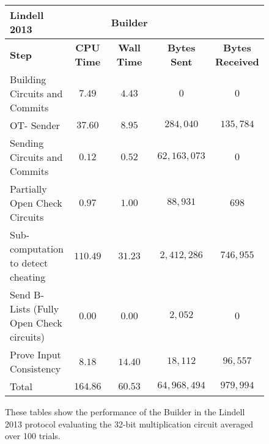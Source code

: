 \documentclass[ %
                    author={Nicholas Tutte},
                supervisor={Prof. Nigel Smart},
                    degree={MEng},
                     title={Secure Two Party Computation},
                  subtitle={A practical comparison of recent protocols},
                      type={Research - GG1K},
                      year={2015} ]{dissertation}
\begin{document}
				\begin{figure}
					\begin{tabular}{| p{3.5cm} | c c c c |}
						\hline
						\textbf{Lindell 2013} & & \textbf{Builder} & & \\
						\hline
						\textbf{Step} & \textbf{CPU Time} & \textbf{Wall Time} & \textbf{Bytes Sent} & \textbf{Bytes Received} \\
						\thickhline
						Building Circuits and Commits & $7.49$ & $4.43$ & $0$ & $0$ \\
						\hline
						OT- Sender & $37.60$ & $8.95$ & $284,040$ & $135,784$ \\
						\hline
						Sending Circuits and Commits & $0.12$ & $0.52$ & $62,163,073$ & $0$ \\
						\hline
						Partially Open Check Circuits & $0.97$ & $1.00$ & $88,931$ & $698$ \\
						\hline
						Sub-computation to detect cheating & $110.49$ & $31.23$ & $2,412,286$ & $746,955$ \\
						\hline
						Send B-Lists (Fully Open Check circuits) & $0.00$ & $0.00$ & $2,052$ & $0$ \\ 
						\hline
						Prove Input Consistency & $8.18$ & $14.40$ & $18,112$ & $96,557$ \\
						\thickhline
						Total & $164.86$ & $60.53$ & $64,968,494$ & $979,994$ \\
						\hline
					\end{tabular}
					\caption{These tables show the performance of the Builder in the Lindell 2013 protocol evaluating the 32-bit multiplication circuit averaged over 100 trials. \label{table:L_2013_Mul_Builder} }
				\end{figure}
				
\end{document}
